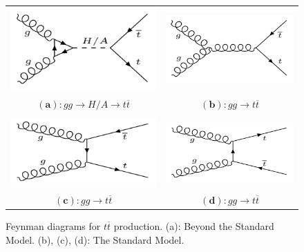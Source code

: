 \documentclass{cmspaper}
\begin{document}
\begin{figure}[htp]
\centering
\begin{tabular}{cc}
\hspace{-0.5cm}
\includegraphics[scale=0.53]{diagrams/signal.png}
& \hspace{0.2cm} \includegraphics[scale=0.50]{diagrams/SMsignal_b.png}\\
   $(\mathbf{a}): gg\rightarrow H/A \rightarrow t\overline{t}$\qquad\qquad&$(\mathbf{b}): gg \rightarrow t\overline{t}$\\ \\
\hspace{-0.5cm}
\includegraphics[scale=0.50]{diagrams/SMsignal_c.png}
& \hspace{0.2cm} \includegraphics[scale=0.50]{diagrams/SMsignal_d.png}\\
   $(\mathbf{c}): gg \rightarrow t\overline{t}$\qquad\qquad&$(\mathbf{d}): gg \rightarrow t\overline{t}$\\
\end{tabular}
\caption{Feynman diagrams for $t\overline{t}$ production. (a): Beyond the Standard Model. (b), (c), (d): The Standard Model.}\label{feynSig}
\end{figure}
\end{document}
